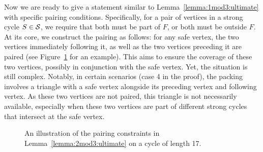 Now we are ready to give a statement similar to Lemma~\ref{lemma:1mod3:ultimate} with specific pairing conditions.
Specifically, for a pair of vertices in a strong cycle $S \in \mathcal S$, we require that both must be part of $F$, or both must be outside $F$.
At its core, we construct the pairing as follows: for any safe vertex, the two vertices immediately following it, as well as the two vertices preceding it are paired (see Figure~\ref{fig:2mod3:pairing} for an example).
This aims to ensure the coverage of these two vertices, possibly in conjunction with the safe vertex.
Yet, the situation is still complex.
Notably, in certain scenarios (case 4 in the proof), the packing involves a triangle with a safe vertex alongside its preceding vertex and following vertex.
As these two vertices are not paired, this triangle is not necessarily available, especially when these two vertices are part of different strong cycles that intersect at the safe vertex.

\begin{figure}
  \centering
  \caption{An illustration of the pairing constraints in Lemma~\ref{lemma:2mod3:ultimate} on a cycle of length 17.}
  \label{fig:2mod3:pairing}
\end{figure}

